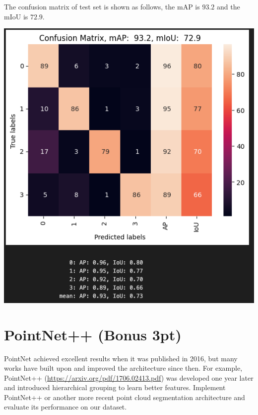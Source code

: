\documentclass[11pt]{article}
\begin{document}
The confusion matrix of test set is shown as follows, the mAP is $93.2$ and the mIoU is $72.9$.
\begin{center}
    \includegraphics[width=0.3\linewidth]{fig/Q7output4.png}
\end{center}

\section*{PointNet++ (Bonus 3pt)}

PointNet achieved excellent results when it was published in 2016, but many works have built upon and improved the architecture since then. For example, PointNet++ (\url{https://arxiv.org/pdf/1706.02413.pdf}) was developed one year later and introduced hierarchical grouping to learn better features. Implement PointNet++ or another more recent point cloud segmentation architecture and evaluate its performance on our dataset.
\end{document}
